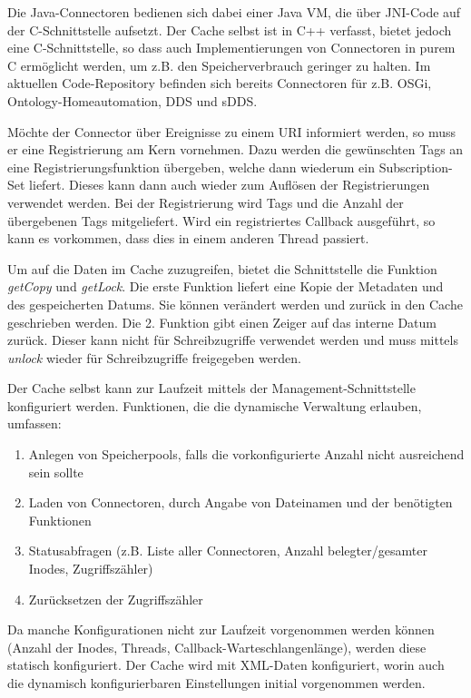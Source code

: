 Die Java-Connectoren bedienen sich dabei einer Java VM, die über JNI-Code auf der C-Schnittstelle aufsetzt.
Der Cache selbst ist in C++ verfasst, bietet jedoch eine C-Schnittstelle, so dass auch Implementierungen von
Connectoren in purem C ermöglicht werden, um z.B. den Speicherverbrauch geringer zu halten.
Im aktuellen Code-Repository \cite{aalcache_code} befinden sich bereits Connectoren für z.B. OSGi,
Ontology-Homeautomation, DDS und sDDS.

Möchte der Connector über Ereignisse zu einem URI informiert werden, so muss er
eine Registrierung am Kern vornehmen.
Dazu werden die gewünschten Tags an eine Registrierungsfunktion übergeben, welche
dann wiederum ein Subscription-Set liefert.
Dieses kann dann auch wieder zum Auflösen der Registrierungen verwendet werden.
Bei der Registrierung wird Tags und die Anzahl der übergebenen Tags mitgeliefert.
Wird ein registriertes Callback ausgeführt, so kann es vorkommen, dass dies in einem anderen
Thread passiert.

Um auf die Daten im Cache zuzugreifen, bietet die Schnittstelle die Funktion \emph{getCopy}
und \emph{getLock}.
Die erste Funktion liefert eine Kopie der Metadaten und des gespeicherten Datums.
Sie können verändert werden und zurück in den Cache geschrieben werden.
Die 2. Funktion gibt einen Zeiger auf das interne Datum zurück.
Dieser kann nicht für Schreibzugriffe verwendet werden und muss mittels \emph{unlock}
wieder für Schreibzugriffe freigegeben werden.

\vfill
\pagebreak

Der Cache selbst kann zur Laufzeit mittels der Management-Schnittstelle konfiguriert werden.
Funktionen, die die dynamische Verwaltung erlauben, umfassen:
\begin{enumerate}
\item Anlegen von Speicherpools, falls die vorkonfigurierte Anzahl nicht ausreichend sein sollte
\item Laden von Connectoren, durch Angabe von Dateinamen und der benötigten Funktionen
\item Statusabfragen (z.B. Liste aller Connectoren, Anzahl belegter/gesamter Inodes, Zugriffszähler)
\item Zurücksetzen der Zugriffszähler
\end{enumerate}
Da manche Konfigurationen nicht zur Laufzeit vorgenommen werden können (Anzahl der Inodes, Threads,
Callback-Warteschlangenlänge), werden diese statisch konfiguriert.
Der Cache wird mit XML-Daten konfiguriert, worin auch die dynamisch konfigurierbaren Einstellungen
initial vorgenommen werden.

